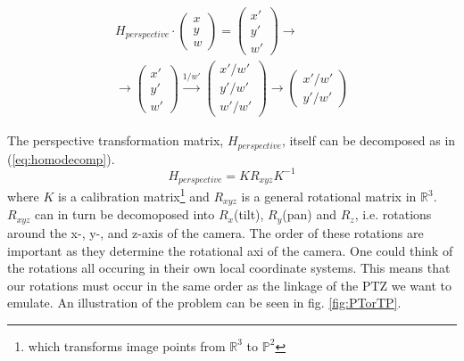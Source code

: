 	\begin{multline}
		H_{perspective}\cdot
		\begin{pmatrix} 
			x \\ 
			y \\ 
			w 
		\end{pmatrix}=
		\begin{pmatrix}
			x' \\ 
			y' \\ 
			w' 
		\end{pmatrix} \rightarrow \\ 
		\rightarrow 
		\begin{pmatrix}
			x' \\ 
			y' \\ 
			w' 
		\end{pmatrix} \xrightarrow{1/w'} 
		\begin{pmatrix}
			x'/w' \\ 
			y'/w' \\ 
			w'/w' 
		\end{pmatrix} \rightarrow 
		\begin{pmatrix} 
			x'/w' \\ 
			y'/w' 
		\end{pmatrix}
		\label{eq:homoapp}
	\end{multline}

	The perspective transformation matrix, $H_{perspective}$, itself can be decomposed as in (\ref{eq:homodecomp}).
	\begin{equation}
		H_{perspective}=KR_{xyz}K^{-1}
		\label{eq:homodecomp}
	\end{equation}
	where $K$ is a calibration matrix\footnote{which transforms image points from $\mathbb{R}^3$ to $\mathbb{P}^2$} and $R_{xyz}$ is a general rotational matrix in $\mathbb{R}^3$.
$R_{xyz}$ can in turn be decomoposed into $R_x$(tilt), $R_y$(pan) and $R_z$, i.e. rotations around the x-, y-, and z-axis of the camera.
The order of these rotations are important as they determine the rotational axi of the camera. 
One could think of the rotations all occuring in their own local coordinate systems. 
This means that our rotations must occur in the same order as the linkage of the PTZ we want to emulate. 
An illustration of the problem can be seen in fig. \ref{fig:PTorTP}.

